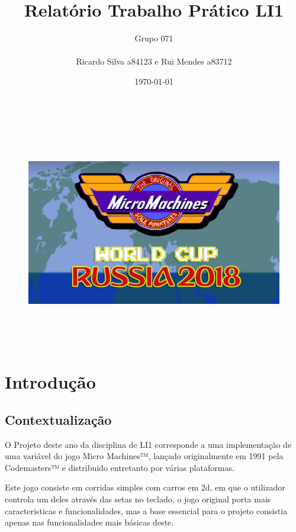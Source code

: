 \documentclass[a4paper]{report} %
\begin{document}
\title{Relatório Trabalho Prático LI1}
\author{Grupo 071\\
\\
Ricardo Silva a84123 e Rui Mendes a83712}
\date{\today}

\begin{figure}[tb]
\begin{center}
\includegraphics[width=13cm, height=10cm]{Capa.png}
\end{center}

\end{figure}

\maketitle



\tableofcontents

\listoffigures

\chapter{Introdução}

  \section{Contextualização}
  O Projeto deste ano da disciplina de LI1 corresponde a uma implementação de uma variável do jogo Micro Machines™, lançado originalmente em 1991 pela Codemasters™ e distribuido entretanto por várias plataformas.
  
  Este jogo consiste em corridas simples com carros em 2d, em que o utilizador controla um deles através das setas no teclado, o jogo original porta mais caracteristicas e funcionalidades, mas a base essencial para o projeto consistia apenas nas funcionalidades mais básicas deste.
\end{document}
